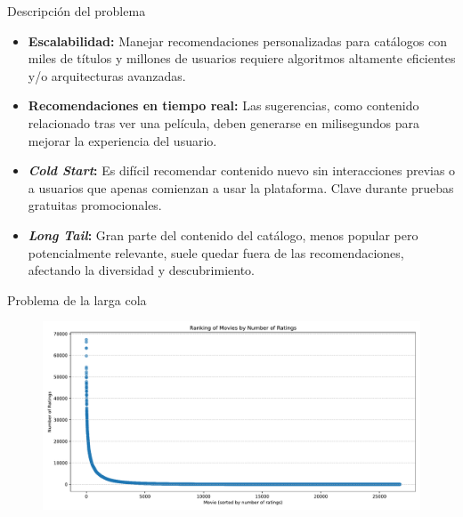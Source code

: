 \documentclass{beamer}
\begin{document}
\begin{frame}{Descripción del problema}
    \begin{itemize}
        \item \textbf{Escalabilidad:} 
        Manejar recomendaciones personalizadas para catálogos con miles de títulos y millones de usuarios requiere algoritmos altamente eficientes y/o arquitecturas avanzadas.

        \item \textbf{Recomendaciones en tiempo real:} 
        Las sugerencias, como contenido relacionado tras ver una película, deben generarse en milisegundos para mejorar la experiencia del usuario.
        
        \item \textbf{\textit{Cold Start}:} 
        Es difícil recomendar contenido nuevo sin interacciones previas o a usuarios que apenas comienzan a usar la plataforma. Clave durante pruebas gratuitas promocionales.
        
        \item \textbf{\textit{Long Tail}:} 
        Gran parte del contenido del catálogo, menos popular pero potencialmente relevante, suele quedar fuera de las recomendaciones, afectando la diversidad y descubrimiento.
        
        
    \end{itemize}
\end{frame}

\begin{frame}{Problema de la larga cola}
    \begin{figure}
        \centering
        \includegraphics[width=\textwidth]{images/ranking_of_movies_by_ratings.pdf}
    \end{figure}
\end{frame}

\end{document}
